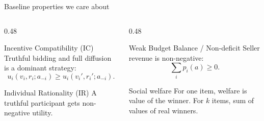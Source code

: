 \documentclass[10pt,aspectratio=169]{beamer}
\newcommand{\greenblock}[2]{\begin{exampleblock}{#1}#2\end{exampleblock}}
\begin{document}
\begin{frame}{Baseline properties we care about}
\begin{columns}[T,totalwidth=\textwidth]
\begin{column}{0.48\textwidth}
\greenblock{Incentive Compatibility (IC)}{
Truthful bidding and full diffusion is a dominant strategy:
\[
 u_i(v_i,r_i; a_{-i}) \ge u_i(v_i',r_i'; a_{-i}).
\]
}
\greenblock{Individual Rationality (IR)}{
A truthful participant gets non-negative utility.
}
\end{column}
\begin{column}{0.48\textwidth}
\greenblock{Weak Budget Balance / Non-deficit}{
Seller revenue is non-negative:
\[
\sum_i p_i(a) \ge 0.
\]
}
\greenblock{Social welfare}{
For one item, welfare is value of the winner. For $k$ items, sum of values of real winners.
}
\end{column}
\end{columns}
\vspace{3mm}
 
\begin{center}
\end{center}
\end{frame}
\end{document}
